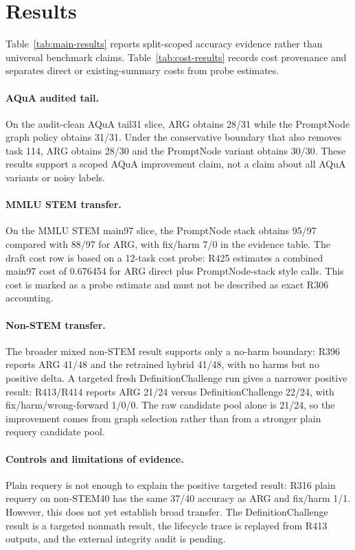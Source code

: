 \section{Results}
\label{sec:results}




Table~\ref{tab:main-results} reports split-scoped accuracy evidence rather than universal benchmark claims. Table~\ref{tab:cost-results} records cost provenance and separates direct or existing-summary costs from probe estimates.

\paragraph{AQuA audited tail.}
On the audit-clean AQuA tail31 slice, ARG obtains 28/31 while the PromptNode graph policy obtains 31/31. Under the conservative boundary that also removes task 114, ARG obtains 28/30 and the PromptNode variant obtains 30/30. These results support a scoped AQuA improvement claim, not a claim about all AQuA variants or noisy labels.

\paragraph{MMLU STEM transfer.}
On the MMLU STEM main97 slice, the PromptNode stack obtains 95/97 compared with 88/97 for ARG, with fix/harm 7/0 in the evidence table. The draft cost row is based on a 12-task cost probe: R425 estimates a combined main97 cost of 0.676454 for ARG direct plus PromptNode-stack style calls. This cost is marked as a probe estimate and must not be described as exact R306 accounting.

\paragraph{Non-STEM transfer.}
The broader mixed non-STEM result supports only a no-harm boundary: R396 reports ARG 41/48 and the retrained hybrid 41/48, with no harms but no positive delta. A targeted fresh DefinitionChallenge run gives a narrower positive result: R413/R414 reports ARG 21/24 versus DefinitionChallenge 22/24, with fix/harm/wrong-forward 1/0/0. The raw candidate pool alone is 21/24, so the improvement comes from graph selection rather than from a stronger plain requery candidate pool.

\paragraph{Controls and limitations of evidence.}
Plain requery is not enough to explain the positive targeted result: R316 plain requery on non-STEM40 has the same 37/40 accuracy as ARG and fix/harm 1/1. However, this does not yet establish broad transfer. The DefinitionChallenge result is a targeted nonmath result, the lifecycle trace is replayed from R413 outputs, and the external integrity audit is pending.

